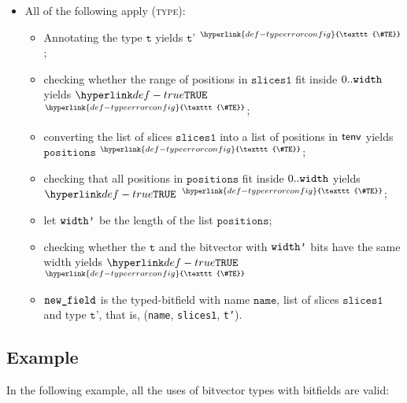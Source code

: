 \documentclass{book}
\newcommand\TypeErrorConfig[0]{\hyperlink{def-typeerrorconfig}{\texttt{\#TE}}}
\newcommand\ProseOrTypeError[0]{\hyperlink{def-proseortypeerror}{$^{\TypeErrorConfig}$}}
\newcommand\vt[0]{\texttt{t}}
\newcommand\slicesone[0]{\texttt{slices1}}
\newcommand\positions[0]{\texttt{positions}}
\newcommand\vtp[0]{\texttt{t'}}
\newcommand\name[0]{\texttt{name}}
\begin{document}
\begin{itemize}
\begin{itemize}
    \item All of the following apply (\textsc{type}):
    \begin{itemize}
      \item Annotating the type $\vt$ yields $\vtp$ \ProseOrTypeError;
      \item checking whether the range of positions in $\slicesone$ fit inside $0..\texttt{width}$ yields $\True$ \ProseOrTypeError;
      \item converting the list of slices $\slicesone$ into a list of positions in $\textsf{tenv}$ yields $\positions$ \ProseOrTypeError;
      \item checking that all positions in $\positions$ fit inside $0..\texttt{width}$ yields $\True$ \ProseOrTypeError;
      \item let $\texttt{width'}$ be the length of the list $\positions$;
      \item checking whether the $\vt$ and the bitvector with $\texttt{width'}$ bits have the same width yields $\True$ \ProseOrTypeError
      \item $\texttt{new\_field}$ is the typed-bitfield with name $\name$, list of slices $\slicesone$ and type $\vtp$, that is, \BitFieldType(\name, \slicesone, \vtp).
    \end{itemize}
  \end{itemize}
\end{itemize}

\subsection{Example}
In the following example, all the uses of bitvector types with bitfields are valid:

\end{document}
